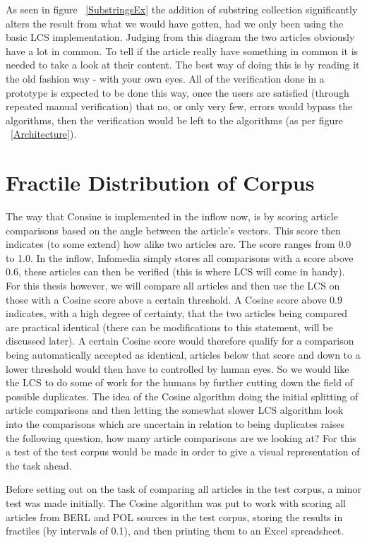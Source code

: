 As seen in figure ~\ref{SubstringsEx} the addition of substring collection significantly alters the result from what we would have gotten, had we only been using the basic LCS implementation. Judging from this diagram the two articles obviously have a lot in common. To tell if the article really have something in common it is needed to take a look at their content. The best way of doing this is by reading it the old fashion way - with your own eyes.  All of the verification done in a prototype is expected to be done this way, once the users are satisfied (through repeated manual verification) that no, or only very few, errors would bypass the algorithms, then the verification would be left to the algorithms (as per figure ~\ref{Architecture}).

\section{Fractile Distribution of Corpus}
The way that Consine is implemented in the inflow now, is by scoring article comparisons based on the angle between the article's vectors. This score then indicates (to some extend) how alike two articles are. The score ranges from 0.0 to 1.0. In the inflow, Infomedia simply stores all comparisons with a score above 0.6, these articles can then be verified (this is where LCS will come in handy). For this thesis however, we will compare all articles and then use the LCS on those with a Cosine score above a certain threshold. A Cosine score above 0.9 indicates, with a high degree of certainty, that the two articles being compared are practical identical (there can be modifications to this statement, will be discussed later). A certain Cosine score would therefore qualify for a comparison being automatically accepted as identical, articles below that score and down to a lower threshold would then have to controlled by human eyes. So we would like the LCS to do some of work for the humans by further cutting down the field of possible duplicates. The idea of the Cosine algorithm doing the initial splitting of article comparisons and then letting the somewhat slower LCS algorithm look into the comparisons which are uncertain in relation to being duplicates raises the following question, how many article comparisons are we looking at? For this a test of the test corpus would be made in order to give a visual representation of the task ahead.

Before setting out on the task of comparing all articles in the test corpus, a minor test was made initially. The Cosine algorithm was put to work with scoring all articles from BERL and POL sources in the test corpus, storing the results in fractiles (by intervals of 0.1), and then printing them to an Excel spreadsheet.

